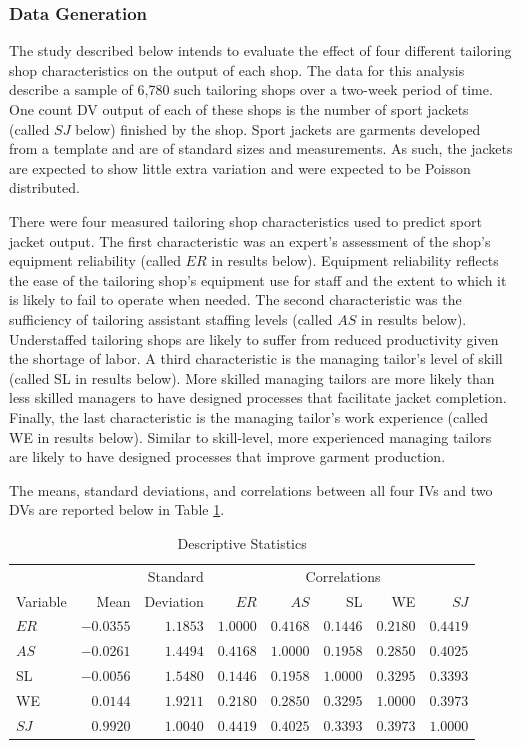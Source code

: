 \documentclass[ShortAfour,times,sageapa]{sagej}
\begin{document}
		\subsubsection{Data Generation}
	
	The study described below intends to evaluate the effect of four different tailoring shop characteristics on the output of each shop.
	The data for this analysis describe a sample of 6,780 such tailoring shops over a two-week period of time.
	One count DV output of each of these shops is the number of sport jackets (called $SJ$ below) finished by the shop.
	Sport jackets are garments developed from a template and are of standard sizes and measurements.
	As such, the jackets are expected to show little extra variation and were expected to be Poisson distributed.
	
	There were four measured tailoring shop characteristics used to predict sport jacket output. 
	The first characteristic was an expert's assessment of the shop's equipment reliability (called $ER$ in results below).
	Equipment reliability reflects the ease of the tailoring shop's equipment use for staff and the extent to which it is likely to fail to operate when needed. 
	The second characteristic was the sufficiency of tailoring assistant staffing levels (called $AS$ in results below).
	Understaffed tailoring shops are likely to suffer from reduced productivity given the shortage of labor.
	A third characteristic is the managing tailor's level of skill (called SL in results below).
	More skilled managing tailors are more likely than less skilled managers to have designed processes that facilitate jacket completion.
	Finally, the last characteristic is the managing tailor's work experience (called WE in results below).
	Similar to skill-level, more experienced managing tailors are likely to have designed processes that improve garment production.
	
	The means, standard deviations, and correlations between all four IVs and two DVs are reported below in Table \ref{tab:desc}. 
	
	\begin{table}[h!]
		\centering
		\caption{\centering Descriptive Statistics} 
		\begin{tabular}{lrr|rrrrr}
			\toprule
			&  & Standard & \multicolumn{5}{c}{Correlations} \\ 
			\cmidrule(lr){4-8}
			Variable & Mean & Deviation & $ER$ & $AS$ & SL & WE & $SJ$ \\ 
			\midrule
			$ER$ & $-0.0355$ & $1.1853$ & $1.0000$ & $0.4168$ & $0.1446$ & $0.2180$ & $0.4419$ \\ 
			$AS$ & $-0.0261$ & $1.4494$ & $0.4168$ & $1.0000$ & $0.1958$ & $0.2850$ & $0.4025$ \\ 
			SL & $-0.0056$ & $1.5480$ & $0.1446$ & $0.1958$ & $1.0000$ & $0.3295$ & $0.3393$ \\ 
			WE & $0.0144$ & $1.9211$ & $0.2180$ & $0.2850$ & $0.3295$ & $1.0000$ & $0.3973$ \\ 
			$SJ$ & $0.9920$ & $1.0040$ & $0.4419$ & $0.4025$ & $0.3393$ & $0.3973$ & $1.0000$ \\ 
			\bottomrule
		\end{tabular}
		\label{tab:desc}
	\end{table}
\end{document}
